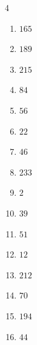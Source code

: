 \begin{multicols}{4}
\begin{enumerate}
  \item $165$


\columnbreak %

  \item $189$


  \item $215$


  \item $84$


  \item $56$


  \item $22$


  \item $46$


  \item $233$


  \item $2$


  \item $39$


  \item $51$


  \item $12$


  \item $212$


  \item $70$


  \item $194$


  \item $44$


\end{enumerate}
\end{multicols}
